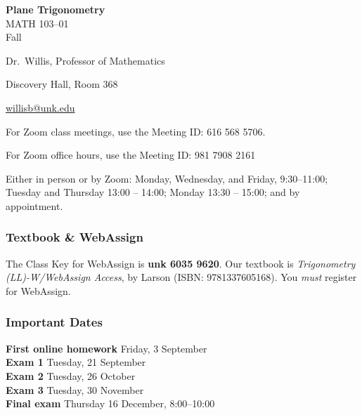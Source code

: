 \documentclass[12pt]{article}
\newcounter{ex}\setcounter{ex}{0}
\newenvironment{mypar}[2]
  {\begin{list}{}%
    {\setlength\leftmargin{#1}
    \setlength\rightmargin{#2}}
    \item[]}
  {\end{list}}
\newcommand{\term}{Fall }
\renewenvironment{description}[0]{\begin{compactdesc}}{\end{compactdesc}}
\newcommand{\coursename}{Plane Trigonometry}
\newcommand{\coursenumber}{MATH 103}
\newcommand{\sectionnumber}{01}
\begin{document}
\large
\begin{center}
    \textbf{\coursename}  \\
    {\coursenumber--\sectionnumber} \\
     {\term \the\year} \\
\end{center}

\vskip0.25in
\normalsize


\begin{center}
\begin{description}
    \item[Instructor:] Dr.\  Willis, Professor of Mathematics
    \item[Office:]  Discovery Hall, Room 368
    \item[\phone:]   
    \item[\Email:]    \href{mailto:willisb@unk.edu}{willisb@unk.edu}
    \item[Zoom for classes:] For Zoom class meetings, use the Meeting ID: 616 568 5706. 
    \item[Zoom for office hours:] For Zoom office hours, use the Meeting ID: 981 7908 2161 
    \item[Office Hours:] Either in person or by Zoom: Monday, Wednesday, and  Friday, \mbox{9:30--11:00}; Tuesday and Thursday 13:00 -- 14:00; Monday 13:30 -- 15:00;  and by appointment.
  \end{description}
\end{center}

\subsubsection*{Textbook \& WebAssign}



The Class Key for WebAssign is \textbf{unk 6035 9620}. Our textbook is
\emph{Trigonometry (LL)-W/WebAssign Access}, by Larson (ISBN: 9781337605168).
You \emph{must} register for WebAssign.

\subsubsection*{Important Dates}

\begin{mypar}{0.25in}{0.25in}
    \textbf{First online homework} \dotfill Friday, 3 September \\
    \textbf{Exam 1} \dotfill Tuesday, 21 September \\
    \textbf{Exam 2} \dotfill Tuesday, 26 October \\
    \textbf{Exam 3} \dotfill Tuesday, 30 November \\
     \textbf{Final exam} \dotfill Thursday 16 December, 8:00--10:00
\end{mypar}
\end{document}
